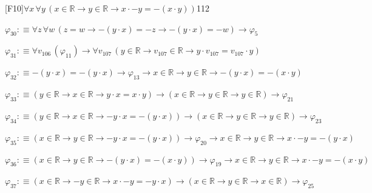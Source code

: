 \begin{fullproof}{[F10]}{$\forall x\,\forall y\,(x \in \mathbb{R} \to y \in \mathbb{R} \to x \cdot -y = -(x \cdot y))$}{112}
\begin{abbrevlist}
\item $\varphi_{30} :\equiv \forall z\,\forall w\,(z = w \to -(y \cdot x) = -z \to -(y \cdot x) = -w) \to \varphi_{5}$
\item $\varphi_{31} :\equiv \forall v_{106}\,(\varphi_{11}) \to \forall v_{107}\,(y \in \mathbb{R} \to v_{107} \in \mathbb{R} \to y \cdot v_{107} = v_{107} \cdot y)$
\item $\varphi_{32} :\equiv -(y \cdot x) = -(y \cdot x) \to \varphi_{13} \to x \in \mathbb{R} \to y \in \mathbb{R} \to -(y \cdot x) = -(x \cdot y)$
\item $\varphi_{33} :\equiv (y \in \mathbb{R} \to x \in \mathbb{R} \to y \cdot x = x \cdot y) \to (x \in \mathbb{R} \to y \in \mathbb{R} \to y \in \mathbb{R}) \to \varphi_{21}$
\item $\varphi_{34} :\equiv (y \in \mathbb{R} \to x \in \mathbb{R} \to -y \cdot x = -(y \cdot x)) \to (x \in \mathbb{R} \to y \in \mathbb{R} \to y \in \mathbb{R}) \to \varphi_{23}$
\item $\varphi_{35} :\equiv (x \in \mathbb{R} \to y \in \mathbb{R} \to -y \cdot x = -(y \cdot x)) \to \varphi_{20} \to x \in \mathbb{R} \to y \in \mathbb{R} \to x \cdot -y = -(y \cdot x)$
\item $\varphi_{36} :\equiv (x \in \mathbb{R} \to y \in \mathbb{R} \to -(y \cdot x) = -(x \cdot y)) \to \varphi_{19} \to x \in \mathbb{R} \to y \in \mathbb{R} \to x \cdot -y = -(x \cdot y)$
\item $\varphi_{37} :\equiv (x \in \mathbb{R} \to -y \in \mathbb{R} \to x \cdot -y = -y \cdot x) \to (x \in \mathbb{R} \to y \in \mathbb{R} \to x \in \mathbb{R}) \to \varphi_{25}$
\end{abbrevlist}
\end{fullproof}
